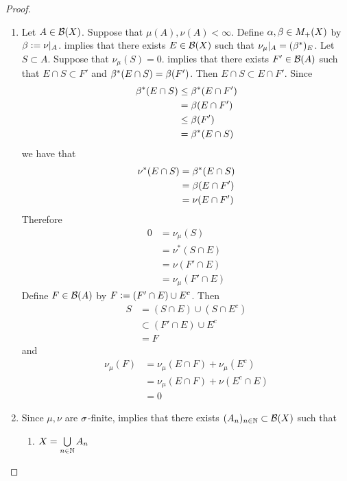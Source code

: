 \documentclass{book}
\begin{document}
	\begin{proof} \
		\begin{enumerate}
			\item Let $A \in \mathcal{B}(X)$. Suppose that $\mu(A), \nu(A) < \infty$. Define $\alpha, \beta \in M_+(X)$ by $\beta \vcentcolon= \nu|_A$.  implies that there exists $E \in \mathcal{B}(X)$ such that $\nu_{\mu}|_A = (\beta^*)_E$. Let $S \subset A$. Suppose that $\nu_{\mu}(S) = 0$.  implies that there exists $F' \in \mathcal{B}(A)$ such that $E \cap S \subset F'$ and $\beta^*(E \cap S) = \beta(F')$. Then $E \cap S \subset E \cap F'$. Since 
			\begin{align*}
				\beta^*(E \cap S)
				& \leq \beta^*(E \cap F') \\
				& = \beta(E \cap F') \\
				& \leq \beta(F') \\
				& = \beta^*(E \cap S)
			\end{align*}
			we have that  
			\begin{align*}
				\nu^*(E \cap S)
				& = \beta^*(E \cap S) \\
				& = \beta(E \cap F') \\
				& = \nu(E \cap F')
			\end{align*}
			Therefore
			\begin{align*}
				0
				& = \nu_{\mu}(S) \\
				& = \nu^*(S \cap E) \\
				& = \nu(F' \cap E) \\
				& = \nu_{\mu}(F' \cap E)
			\end{align*}
			Define $F \in \mathcal{B}(A)$ by $F \vcentcolon= (F' \cap E) \cup E^c$. Then 
			\begin{align*}
				S
				& = (S \cap E) \cup (S \cap E^c) \\
				& \subset (F' \cap E) \cup E^c \\
				& = F
			\end{align*}
			and 
			\begin{align*}
				\nu_{\mu}(F)
				& = \nu_{\mu}(E \cap F) + \nu_{\mu}(E^c) \\
				& = \nu_{\mu}(E \cap F)  + \nu(E^c \cap E) \\
				& = 0
			\end{align*}
			\item Since $\mu , \nu$ are $\sigma$-finite,  implies that there exists $(A_n)_{n \in \mathbb{N}} \subset \mathcal{B}(X)$ such that 
			\begin{enumerate}
				\item $X = \bigcup\limits_{n \in \mathbb{N}} A_n$

\end{enumerate}
\end{enumerate}
\end{proof}
\end{document}
